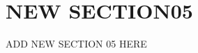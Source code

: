 \documentclass[../main.tex]{subfiles}
\begin{document}
\section{NEW SECTION05}
\label{sec:new_section_05}
ADD NEW SECTION 05 HERE
\end{document}
